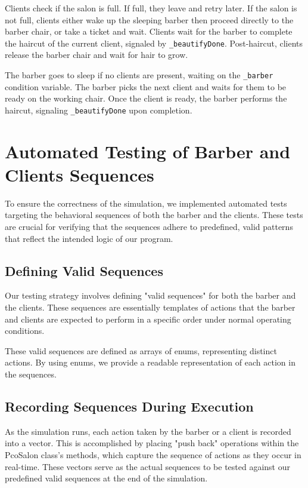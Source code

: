 \documentclass{article}
\begin{document}
    Clients check if the salon is full. If full, they leave and retry later. If the salon is not full, clients either wake up the sleeping barber then proceed directly to the barber chair, or take a ticket and wait. Clients wait for the barber to complete the haircut of the current client, signaled by \texttt{\_beautifyDone}. Post-haircut, clients release the barber chair and wait for hair to grow.

    The barber goes to sleep if no clients are present, waiting on the \texttt{\_barber} condition variable. The barber picks the next client and waits for them to be ready on the working chair. Once the client is ready, the barber performs the haircut, signaling \texttt{\_beautifyDone} upon completion.

    \section{Automated Testing of Barber and Clients Sequences}

    To ensure the correctness of the simulation, we implemented automated tests targeting the behavioral sequences of both the barber and the clients. These tests are crucial for verifying that the sequences adhere to predefined, valid patterns that reflect the intended logic of our program.

    \subsection{Defining Valid Sequences}

    Our testing strategy involves defining "valid sequences" for both the barber and the clients. These sequences are essentially templates of actions that the barber and clients are expected to perform in a specific order under normal operating conditions.

    These valid sequences are defined as arrays of enums, representing distinct actions. By using enums, we provide a readable representation of each action in the sequences.

    \subsection{Recording Sequences During Execution}

    As the simulation runs, each action taken by the barber or a client is recorded into a vector. This is accomplished by placing "push back" operations within the PcoSalon class's methods, which capture the sequence of actions as they occur in real-time. These vectors serve as the actual sequences to be tested against our predefined valid sequences at the end of the simulation.
\end{document}
